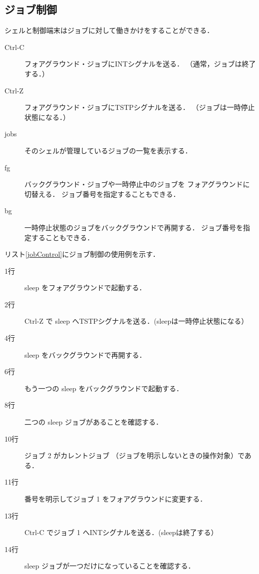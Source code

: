 

\subsection{ジョブ制御}
シェルと制御端末はジョブに対して働きかけをすることができる．

\begin{description}
\item[Ctrl-C] フォアグラウンド・ジョブにINTシグナルを送る．
（通常，ジョブは終了する．）

\item[Ctrl-Z] フォアグラウンド・ジョブにTSTPシグナルを送る．
（ジョブは一時停止状態になる．）

\item[jobs] そのシェルが管理しているジョブの一覧を表示する．

\item[fg] バックグラウンド・ジョブや一時停止中のジョブを
フォアグラウンドに切替える．
ジョブ番号を指定することもできる．

\item[bg] 一時停止状態のジョブをバックグラウンドで再開する．
ジョブ番号を指定することもできる．
\end{description}

リスト\ref{jobControl}にジョブ制御の使用例を示す．



\begin{description}
\item [1行] sleep をフォアグラウンドで起動する．
\item [2行] Ctrl-Z で sleep へTSTPシグナルを送る．(sleepは一時停止状態になる）
\item [4行] sleep をバックグラウンドで再開する．
\item [6行] もう一つの sleep をバックグラウンドで起動する．
\item [8行] 二つの sleep ジョブがあることを確認する．
\item [10行] ジョブ 2 がカレントジョブ
（ジョブを明示しないときの操作対象）である．
\item [11行] 番号を明示してジョブ 1 をフォアグラウンドに変更する．
\item [13行] Ctrl-C でジョブ 1 へINTシグナルを送る．(sleepは終了する）
\item [14行] sleep ジョブが一つだけになっていることを確認する．
\end{description}

